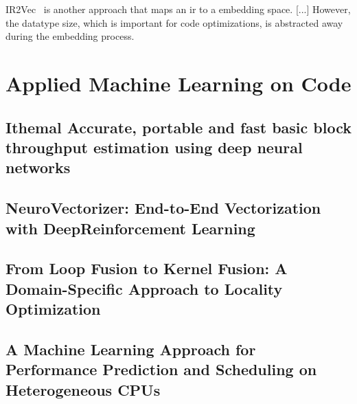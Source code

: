 IR2Vec~\cite{keerthy2019ir2vec} is another approach that maps an \ac{ir} to a embedding space.
[...]
However, the datatype size, which is important for code optimizations, is abstracted away during the embedding process.

\section{Applied Machine Learning on Code}
\subsection*{Ithemal Accurate, portable and fast basic block throughput estimation using deep neural networks}\cite{mendis2019ithemal}
\subsection*{NeuroVectorizer: End-to-End Vectorization with DeepReinforcement Learning}\cite{haj2020neurovectorizer}
\subsection*{From Loop Fusion to Kernel Fusion: A Domain-Specific Approach to Locality Optimization}\cite{qiao2019loop}
\subsection*{A Machine Learning Approach for Performance Prediction and Scheduling on Heterogeneous CPUs}\cite{nemirovsky2017machine}



